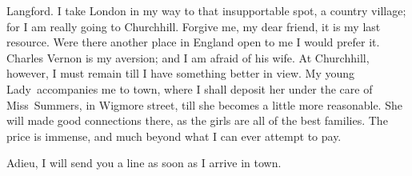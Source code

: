 \begin{mail}{Langford.}{}
I take London in my way to that insupportable spot, a country village; for I am really going to Churchhill. Forgive me, my dear friend, it is my last resource. Were there another place in England open to me I would prefer it. Charles Vernon is my aversion; and I am afraid of his wife. At Churchhill, however, I must remain till I have something better in view. My young Lady~accompanies me to town, where I shall deposit her under the care of Miss~Summers, in Wigmore street, till she becomes a little more reasonable. She will made good connections there, as the girls are all of the best families. The price is immense, and much beyond what I can ever attempt to pay.

Adieu, I will send you a line as soon as I arrive in town. 

\end{mail}